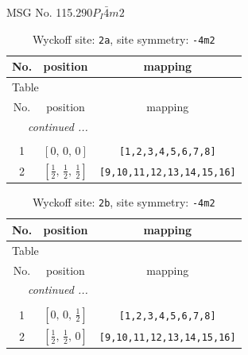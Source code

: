 \documentclass[fleqn,8pt]{jsarticle}
\begin{document}
\setcounter{MaxMatrixCols}{32}

\renewcommand{\tablename}{Table~}
\renewcommand{\figurename}{Figure~}
\begin{center}
\LARGE
MSG No. 115.290\quad$P_{I}\bar{4}m2$
\end{center}
\renewcommand{\arraystretch}{1.2}
\begin{longtable}{ccc}
\caption{Wyckoff site: {\tt 2a}, site symmetry: {\tt -4m2}}
 \\
 \hline \hline
No. & position & mapping \\ \hline \endfirsthead

\multicolumn{2}{l}{\tablename\ \thetable{}} \\
 \hline \hline
No. & position & mapping \\ \hline \endhead

 \hline \hline
\multicolumn{2}{r}{\footnotesize\it continued ...} \\ \endfoot

 \hline \hline
\multicolumn{2}{r}{} \\ \endlastfoot

1 & $\left[ 0,\, 0,\, 0 \right]$ & {\tt [1,2,3,4,5,6,7,8]} \\ \hline
2 & $\left[ \frac{1}{2},\, \frac{1}{2},\, \frac{1}{2} \right]$ & {\tt [9,10,11,12,13,14,15,16]} \\
\end{longtable}
\renewcommand{\arraystretch}{1.2}
\begin{longtable}{ccc}
\caption{Wyckoff site: {\tt 2b}, site symmetry: {\tt -4m2}}
 \\
 \hline \hline
No. & position & mapping \\ \hline \endfirsthead

\multicolumn{2}{l}{\tablename\ \thetable{}} \\
 \hline \hline
No. & position & mapping \\ \hline \endhead

 \hline \hline
\multicolumn{2}{r}{\footnotesize\it continued ...} \\ \endfoot

 \hline \hline
\multicolumn{2}{r}{} \\ \endlastfoot

1 & $\left[ 0,\, 0,\, \frac{1}{2} \right]$ & {\tt [1,2,3,4,5,6,7,8]} \\ \hline
2 & $\left[ \frac{1}{2},\, \frac{1}{2},\, 0 \right]$ & {\tt [9,10,11,12,13,14,15,16]} \\
\end{longtable}
\end{document}
